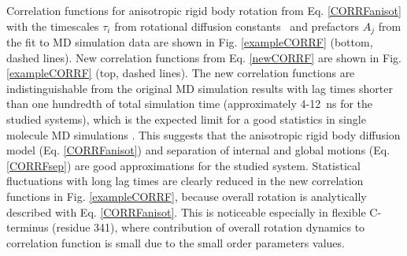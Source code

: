 \documentclass[pre,aps,floatfix,authordate1-4,twocolumn]{revtex4-1}
\begin{document}
Correlation functions for anisotropic rigid body rotation
from Eq. \ref{CORRFanisot} with the timescales $\tau_i$
from rotational diffusion constants~\cite{Note1} and
prefactors $A_j$ from the fit to MD simulation data are
shown in Fig. \ref{exampleCORRF} (bottom, dashed lines). New correlation functions
from Eq. \ref{newCORRF} are shown in Fig. \ref{exampleCORRF} (top, dashed lines).
The new correlation functions are indistinguishable
from the original MD simulation results with lag times shorter than one
hundredth of total simulation time (approximately 4-12~ns for the studied systems),
which is the expected limit for a good statistics in single molecule MD simulations \cite{lu06}.
This suggests that the anisotropic rigid body diffusion model (Eq. \ref{CORRFanisot}) and
separation of internal and global motions (Eq. \ref{CORRFsep}) are
good approximations for the studied system. Statistical fluctuations with long lag times
are clearly reduced in the new correlation functions in Fig. \ref{exampleCORRF}, because overall
rotation is analytically described with Eq. \ref{CORRFanisot}.
This is noticeable especially in flexible C-terminus (residue 341),
where contribution of overall rotation dynamics to correlation function
is small due to the small order parameters values.


\end{document}
